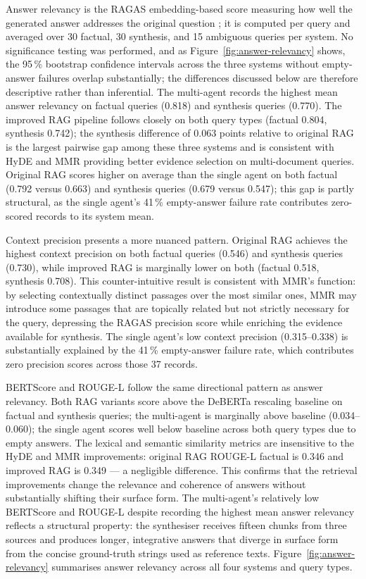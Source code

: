 Answer relevancy is the RAGAS embedding-based score measuring how well the generated answer addresses the original question \cite{es2023ragas}; it is computed per query and averaged over 30 factual, 30 synthesis, and 15 ambiguous queries per system. No significance testing was performed, and as Figure~\ref{fig:answer-relevancy} shows, the 95\,\% bootstrap confidence intervals across the three systems without empty-answer failures overlap substantially; the differences discussed below are therefore descriptive rather than inferential. The multi-agent records the highest mean answer relevancy on factual queries (0.818) and synthesis queries (0.770). The improved RAG pipeline follows closely on both query types (factual 0.804, synthesis 0.742); the synthesis difference of 0.063 points relative to original RAG is the largest pairwise gap among these three systems and is consistent with HyDE and MMR providing better evidence selection on multi-document queries. Original RAG scores higher on average than the single agent on both factual (0.792 versus 0.663) and synthesis queries (0.679 versus 0.547); this gap is partly structural, as the single agent's 41\,\% empty-answer failure rate contributes zero-scored records to its system mean.

Context precision presents a more nuanced pattern. Original RAG achieves the highest context precision on both factual queries (0.546) and synthesis queries (0.730), while improved RAG is marginally lower on both (factual 0.518, synthesis 0.708). This counter-intuitive result is consistent with MMR's function: by selecting contextually distinct passages over the most similar ones, MMR may introduce some passages that are topically related but not strictly necessary for the query, depressing the RAGAS precision score while enriching the evidence available for synthesis. The single agent's low context precision (0.315--0.338) is substantially explained by the 41\,\% empty-answer failure rate, which contributes zero precision scores across those 37 records.

BERTScore and ROUGE-L follow the same directional pattern as answer relevancy. Both RAG variants score above the DeBERTa rescaling baseline on factual and synthesis queries; the multi-agent is marginally above baseline (0.034--0.060); the single agent scores well below baseline across both query types due to empty answers. The lexical and semantic similarity metrics are insensitive to the HyDE and MMR improvements: original RAG ROUGE-L factual is 0.346 and improved RAG is 0.349 — a negligible difference. This confirms that the retrieval improvements change the relevance and coherence of answers without substantially shifting their surface form. The multi-agent's relatively low BERTScore and ROUGE-L despite recording the highest mean answer relevancy reflects a structural property: the synthesiser receives fifteen chunks from three sources and produces longer, integrative answers that diverge in surface form from the concise ground-truth strings used as reference texts. Figure~\ref{fig:answer-relevancy} summarises answer relevancy across all four systems and query types.

